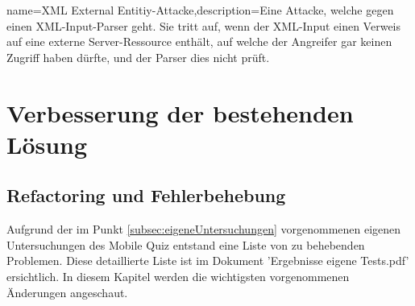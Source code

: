 
 {name={XML External Entitiy-Attacke},description={Eine Attacke, welche gegen einen XML-Input-Parser geht. Sie tritt auf, wenn der XML-Input einen Verweis auf eine externe Server-Ressource enthält, auf welche der Angreifer gar keinen Zugriff haben dürfte, und der Parser dies nicht prüft. \cite{xxe}}}



	





\section{Verbesserung der bestehenden Lösung}

\subsection{\gls{Refactoring} und Fehlerbehebung}

Aufgrund der im Punkt \ref{subsec:eigeneUntersuchungen} vorgenommenen eigenen Untersuchungen des Mobile Quiz entstand eine Liste von zu behebenden Problemen. Diese detaillierte Liste ist im Dokument 'Ergebnisse eigene Tests.pdf' ersichtlich. In diesem Kapitel werden die wichtigsten vorgenommenen Änderungen angeschaut.

